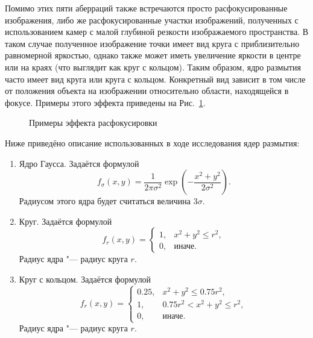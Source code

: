 Помимо этих пяти аберраций также встречаются просто расфокусированные изображения, либо же расфокусированные участки изображений, полученных с использованием камер с малой глубиной резкости изображаемого пространства. В таком случае полученное изображение точки имеет вид круга с приблизительно равномерной яркостью, однако также может иметь увеличение яркости в центре или на краях (что выглядит как круг с кольцом). Таким образом, ядро размытия часто имеет вид круга или круга с кольцом. Конкретный вид зависит в том числе от положения объекта на изображении относительно области, находящейся  в фокусе. Примеры этого эффекта приведены на Рис.~\ref{fig:warping-defocus}.

\begin{figure}[ht]
	\caption{Примеры эффекта расфокусировки}
	\label{fig:warping-defocus}
\end{figure}

Ниже приведёно описание использованных в ходе исследования  ядер размытия:
\begin{enumerate}[beginpenalty=10000]
	\item Ядро Гаусса.
	Задаётся формулой
	$$f_\sigma\left(x,y\right) = \frac{1}{2\pi\sigma^2}\exp\left(-\frac{x^2+y^2}{2\sigma^2}\right).$$
	Радиусом этого ядра будет считаться величина $3\sigma$.
	
	\item Круг.
	Задаётся формулой $$f_r\left(x,y\right) = \begin{cases}
		1, & x^2 + y^2 \leq r^2, \\
		0, & \text{иначе}.
	\end{cases}$$ Радиус ядра "--- радиус круга $r$.
	
	\item Круг с кольцом.
	Задаётся формулой $$f_r(x, y) = \begin{cases}
		0.25, & x^2 + y^2 \leq 0.75 r^2,\\
		1, & 0.75 r^2 < x^2 + y^2 \leq r^2,\\
		0, & \text{иначе}.
	\end{cases}$$ Радиус ядра "--- радиус круга $r$.
\end{enumerate}

